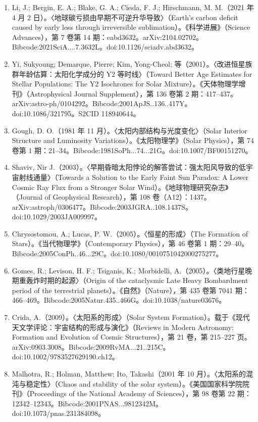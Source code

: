 \begin{enumerate}
\item Li, J.; Bergin, E. A.; Blake, G. A.; Ciesla, F. J.; Hirschmann, M. M.（2021 年 4 月 2 日）。〈地球碳亏损由早期不可逆升华导致〉（Earth's carbon deficit caused by early loss through irreversible sublimation）。《科学进展》（Science Advances），第 7 卷第 14 期：eabd3632。arXiv:2104.02702。Bibcode:2021SciA....7.3632L。doi:10.1126/sciadv.abd3632。
\item Yi, Sukyoung; Demarque, Pierre; Kim, Yong-Cheol; 等（2001）。〈改进恒星族群年龄估算：太阳化学成分的 Y2 等时线〉（Toward Better Age Estimates for Stellar Populations: The Y2 Isochrones for Solar Mixture）。《天体物理学增刊》（Astrophysical Journal Supplement），第 136 卷第 2 期：417–437。arXiv:astro-ph/0104292。Bibcode:2001ApJS..136..417Y。doi:10.1086/321795。S2CID 118940644。
\item Gough, D. O.（1981 年 11 月）。〈太阳内部结构与光度变化〉（Solar Interior Structure and Luminosity Variations）。《太阳物理学》（Solar Physics），第 74 卷第 1 期：21–34。Bibcode:1981SoPh...74...21G。doi:10.1007/BF00151270。
\item Shaviv, Nir J.（2003）。〈早期昏暗太阳悖论的解答尝试：强太阳风导致的低宇宙射线通量〉（Towards a Solution to the Early Faint Sun Paradox: A Lower Cosmic Ray Flux from a Stronger Solar Wind）。《地球物理研究杂志》（Journal of Geophysical Research），第 108 卷（A12）：1437。arXiv:astroph/0306477。Bibcode:2003JGRA..108.1437S。doi:10.1029/2003JA009997。
\item Chrysostomou, A.; Lucas, P. W.（2005）。〈恒星的形成〉（The Formation of Stars）。《当代物理学》（Contemporary Physics），第 46 卷第 1 期：29–40。Bibcode:2005ConPh..46...29C。doi:10.1080/0010751042000275277。
\item Gomes, R.; Levison, H. F.; Tsiganis, K.; Morbidelli, A.（2005）。〈类地行星晚期重轰炸时期的起源〉（Origin of the cataclysmic Late Heavy Bombardment period of the terrestrial planets）。《自然》（Nature），第 435 卷第 7041 期：466–469。Bibcode:2005Natur.435..466G。doi:10.1038/nature03676。
\item Crida, A.（2009）。〈太阳系的形成〉（Solar System Formation）。载于《现代天文学评论：宇宙结构的形成与演化》（Reviews in Modern Astronomy: Formation and Evolution of Cosmic Structures），第 21 卷，第 215–227 页。arXiv:0903.3008。Bibcode:2009RvMA...21..215C。doi:10.1002/9783527629190.ch12。
\item Malhotra, R.; Holman, Matthew; Ito, Takashi（2001 年 10 月）。〈太阳系的混沌与稳定性〉（Chaos and stability of the solar system）。《美国国家科学院院刊》（Proceedings of the National Academy of Sciences），第 98 卷第 22 期：12342–12343。Bibcode:2001PNAS...9812342M。doi:10.1073/pnas.231384098。

\end{enumerate}
